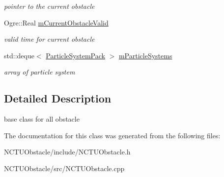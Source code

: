 \begin{DoxyCompactItemize}
\begin{DoxyCompactList}\small\item\em pointer to the current obstacle \end{DoxyCompactList}\item 
Ogre\+::\+Real \hyperlink{class_n_c_t_u_1_1_obstacle_aab0815b13db0dc1cb589ee143f849303}{m\+Current\+Obstacle\+Valid}\hypertarget{class_n_c_t_u_1_1_obstacle_aab0815b13db0dc1cb589ee143f849303}{}\label{class_n_c_t_u_1_1_obstacle_aab0815b13db0dc1cb589ee143f849303}

\begin{DoxyCompactList}\small\item\em valid time for current obstacle \end{DoxyCompactList}\item 
std\+::deque$<$ \hyperlink{struct_n_c_t_u_1_1_particle_system_pack}{Particle\+System\+Pack} $>$ \hyperlink{class_n_c_t_u_1_1_obstacle_a30591db733c980f295b78c1f7f687cfb}{m\+Particle\+Systems}\hypertarget{class_n_c_t_u_1_1_obstacle_a30591db733c980f295b78c1f7f687cfb}{}\label{class_n_c_t_u_1_1_obstacle_a30591db733c980f295b78c1f7f687cfb}

\begin{DoxyCompactList}\small\item\em array of particle system \end{DoxyCompactList}\end{DoxyCompactItemize}


\subsection{Detailed Description}
base class for all obstacle 

The documentation for this class was generated from the following files\+:\begin{DoxyCompactItemize}
\item 
N\+C\+T\+U\+Obstacle/include/N\+C\+T\+U\+Obstacle.\+h\item 
N\+C\+T\+U\+Obstacle/src/N\+C\+T\+U\+Obstacle.\+cpp\end{DoxyCompactItemize}
